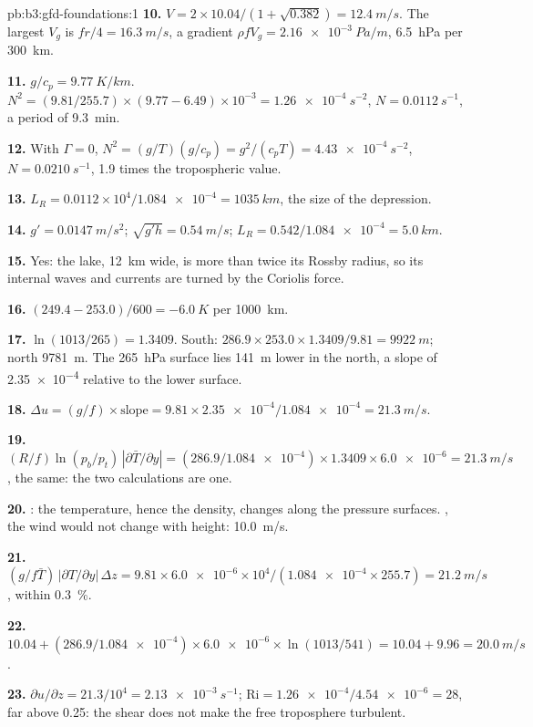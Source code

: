 \begin{solution}{pb:b3:gfd-foundations:1}
\textbf{10.} $V = 2\times10.04/(1 + \sqrt{0.382}) = \qty{12.4}{m/s}$. The
largest $V_g$ is $fr/4 = \qty{16.3}{m/s}$, a gradient $\rho fV_g =
\qty{2.16e-3}{Pa/m}$, \qty{6.5}{hPa} per \qty{300}{km}.

\textbf{11.} $g/c_p = \qty{9.77}{K/km}$. $N^2 = (9.81/255.7)\times(9.77 -
6.49)\times10^{-3} = \qty{1.26e-4}{s^{-2}}$, $N = \qty{0.0112}{s^{-1}}$, a
period of \qty{9.3}{min}.

\textbf{12.} With $\Gamma = 0$, $N^2 = (g/T)(g/c_p) = g^2/(c_pT) =
\qty{4.43e-4}{s^{-2}}$, $N = \qty{0.0210}{s^{-1}}$, 1.9 times the
tropospheric value.

\textbf{13.} $L_R = 0.0112\times10^4/\num{1.084e-4} = \qty{1035}{km}$, the
size of the depression.

\textbf{14.} $g' = \qty{0.0147}{m/s^2}$; $\sqrt{g'h} = \qty{0.54}{m/s}$;
$L_R = 0.542/\num{1.084e-4} = \qty{5.0}{km}$.

\textbf{15.} Yes: the lake, \qty{12}{km} wide, is more than twice its
Rossby radius, so its internal waves and currents are turned by the
Coriolis force.

\textbf{16.} $(249.4 - 253.0)/600 = \qty{-6.0}{K}$ per \qty{1000}{km}.

\textbf{17.} $\ln(1013/265) = 1.3409$. South:
$286.9\times253.0\times1.3409/9.81 = \qty{9922}{m}$; north \qty{9781}{m}.
The \qty{265}{hPa} surface lies \qty{141}{m} lower in the north, a slope of
\num{2.35e-4} relative to the lower surface.

\textbf{18.} $\Delta u = (g/f)\times\text{slope} = 9.81\times\num{2.35e-4}/
\num{1.084e-4} = \qty{21.3}{m/s}$.

\textbf{19.} $(R/f)\ln(p_b/p_t)\,|\partial\bar T/\partial y| =
(286.9/\num{1.084e-4})\times1.3409\times\num{6.0e-6} = \qty{21.3}{m/s}$, the
same: the two calculations are one.

\textbf{20.} : the temperature, hence the density, changes along
the pressure surfaces. , the wind would not change with height:
\qty{10.0}{m/s}.

\textbf{21.} $(g/f\bar T)\,|\partial T/\partial y|\,\Delta z = 9.81\times
\num{6.0e-6}\times10^4/(\num{1.084e-4}\times255.7) = \qty{21.2}{m/s}$,
within \qty{0.3}{\percent}.

\textbf{22.} $10.04 + (286.9/\num{1.084e-4})\times\num{6.0e-6}\times
\ln(1013/541) = 10.04 + 9.96 = \qty{20.0}{m/s}$.

\textbf{23.} $\partial u/\partial z = 21.3/10^4 = \qty{2.13e-3}{s^{-1}}$;
$\mathrm{Ri} = \num{1.26e-4}/\num{4.54e-6} = 28$, far above 0.25: the shear
does not make the free troposphere turbulent.


\end{solution}
